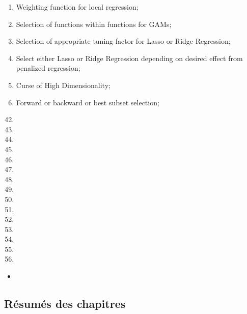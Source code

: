 \documentclass[12pt, titlepage, french]{report}
\begin{document}
\begin{outcomes}
\begin{enumerate}
\begin{knowledge}
\begin{enumerate}[label = \alph*.]
		\item	Weighting function for local regression;
		\item	Selection of functions within functions for GAMs;
		\item	Selection of appropriate tuning factor for Lasso or Ridge Regression;
		\item	Select either Lasso or Ridge Regression depending on desired effect from penalized regression;
		\item	Curse of High Dimensionality;
		\item	Forward or backward or best subset selection;
	\end{enumerate}
	\end{knowledge}
\end{enumerate}
\end{outcomes}

\begin{ASM_chapter}
\begin{enumerate}
  \setcounter{enumi}{41}
	\item	{}
	\item	{}
	\item	{}
	\item	{}
	\item	{}
	\item	{}
	\item	{}
	\item	{}
	\item	{}
	\item	{}
	\item	{}
	\item	{}
	\item	{}
	\item	{}
	\item	{}
\end{enumerate}
\end{ASM_chapter}

\begin{YTB_vids}
\begin{itemize}
	\item	
\end{itemize}
\end{YTB_vids}

\subsection{Résumés des chapitres}
\end{document}
